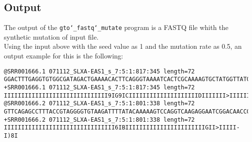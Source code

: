\subsection*{Output}
The output of the \texttt{gto\char`_fastq\char`_mutate} program is a FASTQ file whith the synthetic mutation of input file.\\
Using the input above with the seed value as 1 and the mutation rate as 0.5, an output example for this is the following:
\begin{lstlisting}
@SRR001666.1 071112_SLXA-EAS1_s_7:5:1:817:345 length=72
GGACTTTGAGGTGTGGCGATAGACTGAAAACACTTCAGGGTAAAATCACTCGCAAAAGTGCTATGGTTATGG
+SRR001666.1 071112_SLXA-EAS1_s_7:5:1:817:345 length=72
IIIIIIIIIIIIIIIIIIIIIIIIIIIIII9IG9ICIIIIIIIIIIIIIIIIIIIIDIIIIIII>IIIIII/
@SRR001666.2 071112_SLXA-EAS1_s_7:5:1:801:338 length=72
GTTCAGAGCCTTTACCGTAGGGGTGTAAGATTTTATACAAAAAGTCCAGGTCAAGAGGAATCGGACAACCGA
+SRR001666.2 071112_SLXA-EAS1_s_7:5:1:801:338 length=72
IIIIIIIIIIIIIIIIIIIIIIIIIIIIIIII6IBIIIIIIIIIIIIIIIIIIIIIIIGII>IIIII-I)8I
\end{lstlisting}

